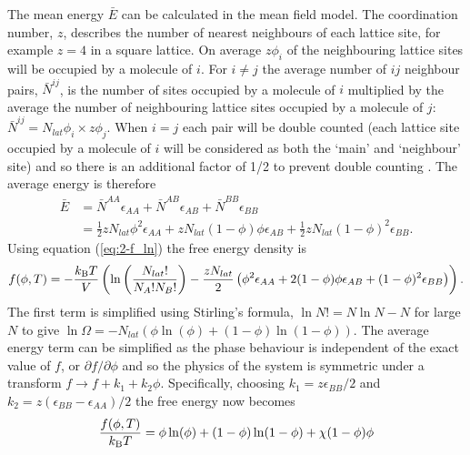 The mean energy $\bar{E}$ can be calculated in the mean field model. The coordination number, $z$, describes the number of nearest neighbours of each lattice site, for example $z=4$ in a square lattice. On average $z\phi_i$ of the neighbouring lattice sites will be occupied by a molecule of $i$. For $i \neq j$ the average number of $ij$ neighbour pairs, $\bar{N}^{ij}$, is the number of sites occupied by a molecule of $i$ multiplied by the average the number of neighbouring lattice sites occupied by a molecule of $j$: $\bar{N}^{ij} = N_{lat}\phi_i \times z\phi_j$. When $i=j$ each pair will be double counted (each lattice site occupied by a molecule of $i$ will be considered as both the `main' and `neighbour' site) and so there is an additional factor of 1/2 to prevent double counting \cite{doi_soft_2013}. The average energy is therefore
\begin{equation}
\begin{split}
    \bar{E} &= \bar{N}^{AA}\epsilon_{AA} + \bar{N}^{AB}\epsilon_{AB} + \bar{N}^{BB}\epsilon_{BB}\\
    &= \frac{1}{2}z N_{lat} \phi^2\epsilon_{AA} + z N_{lat} (1-\phi)\phi\epsilon_{AB} + \frac{1}{2}z N_{lat} (1-\phi)^2 \epsilon_{BB}.
\end{split}
\end{equation}
Using equation (\ref{eq:2-f_ln}) the free energy density is
\begin{equation}
    f(\phi, T) = -\frac{k_{\rm B} T}{V}\left(\ln \left(\frac{N_{lat}!}{N_A! N_B!} \right) - \frac{z N_{lat}}{2} \left(\phi^2\epsilon_{AA} + 2(1-\phi)\phi\epsilon_{AB} + (1-\phi)^2 \epsilon_{BB}\right)\right).
\end{equation}
The first term is simplified using Stirling's formula, $\ln N! = N \ln N - N$ for large $N$ to give $\ln\Omega=-N_{lat}(\phi\ln(\phi)+(1-\phi)\ln(1-\phi))$. The average energy term can be simplified as the phase behaviour is independent of the exact value of $f$, or $\partial f/\partial \phi$ and so the physics of the system is symmetric under a transform $f \rightarrow f + k_1 + k_2\phi$. Specifically, choosing $k_1 = z\epsilon_{BB}/2$ and $k_2 = z(\epsilon_{BB} - \epsilon_{AA})/2$ the free energy now becomes
\begin{equation}
    \frac{f(\phi, T)}{k_{\rm B} T} = \phi\ln(\phi)+(1-\phi)\ln(1-\phi) + \chi(1-\phi)\phi
    \label{eq:2-fh_free}
\end{equation}
